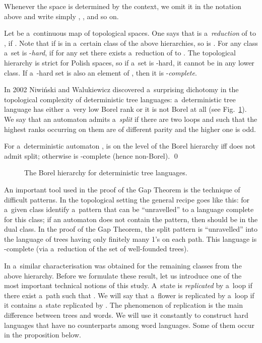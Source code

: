 \documentclass{LMCS}
\begin{document}
Whenever the space  is determined by the context, we omit it in the notation above and write simply , , and so on. 

Let  be a~continuous map of topological spaces. One
says that  is a~{\em reduction} of  to , if . Note that if  is in a~certain class of the above
hierarchies, so is . For any class  a~set  is
-{\em hard}, if for any set  there
exists a~reduction of  to . The topological hierarchy is strict
for Polish spaces, so if a~set is -hard, it cannot be in
any lower class. If a~-hard set  is also an element
of , then it is -{\em complete}.

In 2002 Niwi\'nski and Walukiewicz discovered a~surprising dichotomy
in the topological complexity of deterministic tree languages:
a~deterministic tree language has either a~very low Borel rank or it
is not Borel at all (see Fig.~\ref{fig:borelhierarchy}). We say that
an automaton  admits a~{\em split} if there are two loops  and  such that the highest ranks
occurring on them are of different parity and the higher one is odd.

\begin{thm} \label{topgap} 
For a~deterministic automaton ,  is on the level  of the Borel hierarchy iff  does not admit split; otherwise  is -complete (hence non-Borel). \qed
\end{thm}

\begin{figure}
\centering
{\setlength\arraycolsep{1pt}
}
\caption{The Borel hierarchy for deterministic tree languages.}
\label{fig:borelhierarchy}
\end{figure}

An important tool used in the proof of the Gap Theorem is the
technique of difficult patterns. In the topological setting the
general recipe goes like this: for a~given class identify a~pattern
that can be ``unravelled'' to a language complete for this class; if
an automaton does not contain the pattern, then  should be in
the dual class. In the proof of the Gap Theorem, the split pattern is
``unravelled'' into the language of trees having only finitely many
1's on each path. This language is -complete (via a~reduction
of the set of well-founded trees).

In \cite{split} a~similar characterisation was obtained for the
remaining classes from the above hierarchy. Before we formulate these
result, let us introduce one of the most important technical notions
of this study. A~state  is {\em replicated} \label{replicated}
  by a~loop  if there exist a~path  such that . We will say
      that a~flower is replicated by a~loop  if it contains
      a~state replicated by . The phenomenon of replication
      is the main difference between trees and words. We will use it
      constantly to construct hard languages that have no counterparts
      among word languages. Some of them occur in the proposition
      below.
\end{document}
